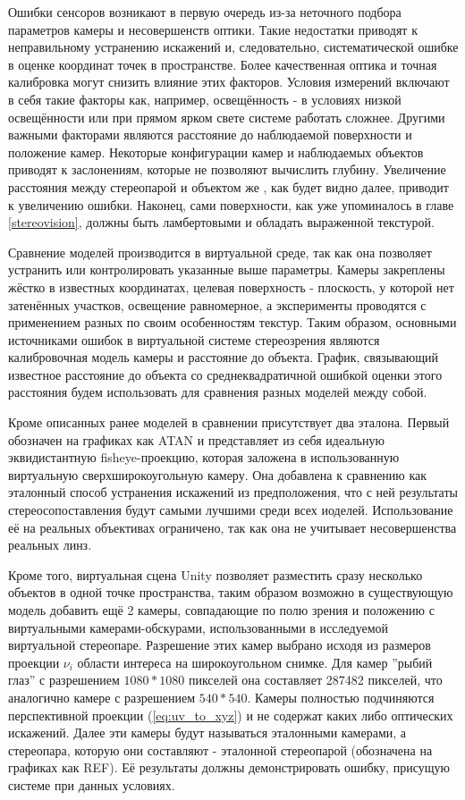 Ошибки сенсоров возникают в первую очередь из-за неточного подбора параметров камеры и несовершенств оптики. Такие недостатки приводят
к неправильному устранению искажений и, следовательно, систематической ошибке в оценке координат точек в пространстве. Более 
качественная оптика и точная калибровка могут снизить влияние этих факторов.
Условия измерений включают в себя такие факторы как, например, освещённость - в условиях низкой освещённости или при прямом ярком свете системе работать сложнее.
Другими важными факторами являются расстояние до наблюдаемой поверхности и положение камер. Некоторые конфигурации камер и наблюдаемых объектов приводят к
заслонениям, которые не позволяют вычислить глубину. Увеличение расстояния между стереопарой и объектом же , как будет видно далее, приводит к увеличению ошибки.  
Наконец, сами поверхности, как уже упоминалось в главе \ref{stereovision}, должны быть ламбертовыми и обладать выраженной текстурой. 

Сравнение моделей производится в виртуальной среде, так как она позволяет устранить или контролировать указанные выше параметры. Камеры закреплены жёстко в 
известных координатах, целевая поверхность - плоскость, у которой нет затенённых участков, освещение равномерное, а эксперименты проводятся с 
применением разных по своим особенностям текстур. Таким образом, основными источниками ошибок в виртуальной системе стереозрения являются калибровочная модель 
камеры и расстояние до объекта. График, связывающий известное расстояние до объекта со среднеквадратичной ошибкой оценки этого расстояния будем использовать
для сравнения разных моделей между собой. 

Кроме описанных ранее моделей в сравнении  присутствует два эталона. Первый обозначен на графиках как ATAN и представляет из себя идеальную 
эквидистантную fisheye-проекцию, которая заложена в использованную виртуальную сверхширокоугольную камеру. Она добавлена к сравнению как 
эталонный способ устранения искажений из предположения, что с ней результаты стереосопоставления будут самыми лучшими среди всех иоделей. 
Использование её на реальных объективах ограничено, так как она не учитывает несовершенства реальных линз. 

Кроме того, виртуальная сцена Unity позволяет разместить сразу несколько объектов в одной точке пространства, таким образом возможно
в существующую модель добавить ещё 2 камеры, совпадающие по полю зрения и положению с виртуальными камерами-обскурами, использованными 
в исследуемой виртуальной стереопаре. Разрешение этих камер выбрано исходя из размеров проекции $\nu_i$ области интереса на широкоугольном
снимке. Для камер ''рыбий глаз'' с разрешением $1080*1080$ пикселей она составляет 287482 пикселей, что аналогично камере 
с разрешением $540*540$. Камеры полностью подчиняются перспективной проекции (\ref{eq:uv_to_xyz}) и не содержат каких либо оптических искажений.
 Далее эти камеры будут называться эталонными камерами, а стереопара, которую они составляют - эталонной стереопарой (обозначена на графиках как REF).
Её результаты должны демонстрировать ошибку, присущую системе при данных условиях. %

